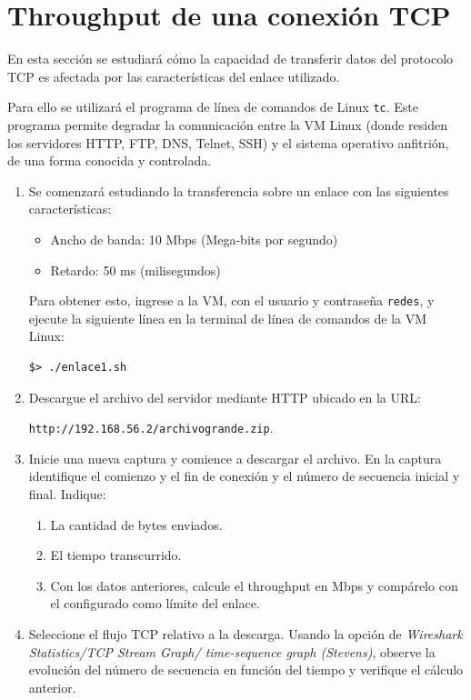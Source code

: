 \documentclass[a4paper,10pt]{article}
\begin{document}
\section{Throughput de una conexión TCP}

En esta sección se estudiará cómo la capacidad de transferir datos del protocolo TCP es afectada por las características del enlace utilizado.

Para ello se utilizará el programa de línea de comandos de Linux \texttt{tc}. Este programa permite degradar la comunicación entre la VM Linux (donde residen los servidores HTTP, FTP, DNS, Telnet, SSH) y el sistema operativo anfitrión, de una forma conocida y controlada.

\begin{enumerate}

    \item Se comenzará estudiando la transferencia sobre un enlace con las siguientes características:
    \begin{itemize}
        \item Ancho de banda: 10 Mbps (Mega-bits por segundo)
        \item Retardo: 50 ms (milisegundos)
    \end{itemize}
    Para obtener esto, ingrese a la VM, con el usuario y contraseña \texttt{redes}, y ejecute la siguiente línea en la terminal de línea de comandos de la VM Linux:
    \begin{verbatim}
$> ./enlace1.sh
    \end{verbatim}

    \item Descargue el archivo del servidor mediante HTTP ubicado en la URL:
    
    \texttt{http://192.168.56.2/archivogrande.zip}.
    
    \item Inicie una nueva captura y comience a descargar el archivo. En la captura identifique el comienzo y el fin de conexión y el número de secuencia inicial y final. Indique:
    \begin{enumerate}
        \item La cantidad de bytes enviados.
        \item El tiempo transcurrido.
        \item Con los datos anteriores, calcule el throughput en Mbps y compárelo con el configurado como límite del enlace.
    \end{enumerate}

    \item Seleccione el flujo TCP relativo a la descarga. Usando la opción de \emph{Wireshark Statistics/TCP Stream Graph/ time-sequence graph (Stevens)}, observe la evolución del número de secuencia en función del tiempo y verifique el cálculo anterior.
    

\end{enumerate}
\end{document}
